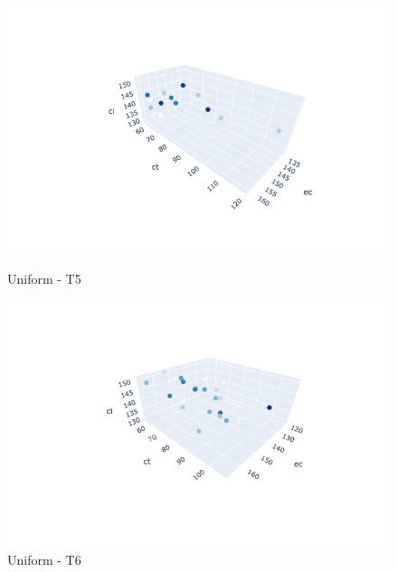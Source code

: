 \documentclass{hust}
\begin{document}
\begin{itemize}
	\begin{figure}[H]
		\begin{minipage}{0.5\textwidth}
			\centering
			\includegraphics[width=1.2\linewidth]{images/uu-dem5.png}
			\caption{Uniform - T5}\label{fig:nsga-ii-uu-dem5}
		\end{minipage}\hfill
		\begin{minipage}{0.5\textwidth}
			\centering
			\includegraphics[width=1.2\linewidth]{images/uu-dem6.png}
			\caption{Uniform - T6}\label{fig:nsga-ii-uu-dem6}
		\end{minipage}
	\end{figure}
	

\end{itemize}
\end{document}
